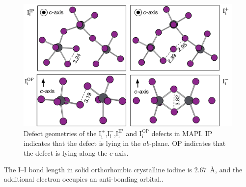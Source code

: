 \begin{figure}[h!]
\centering
  \includegraphics[width=1.0\columnwidth]{figures/ch6/defect_geometries.png}
  \caption[Defect geometries of the $\mathrm{I}_\mathrm{i}^+$,$\mathrm{I}_\mathrm{i}^-$,$\mathrm{I}_\mathrm{i}^\mathrm{IP}$ and $\mathrm{I}_\mathrm{i}^\mathrm{OP}$ defects in MAPI]{Defect geometries of the $\mathrm{I}_\mathrm{i}^+$,$\mathrm{I}_\mathrm{i}^-$,$\mathrm{I}_\mathrm{i}^\mathrm{IP}$ and $\mathrm{I}_\mathrm{i}^\mathrm{OP}$ defects in MAPI. IP indicates that the defect is lying in the $ab$-plane. OP indicates that the defect is lying along the $c$-axis.}
\label{relaxation_workflow}
\end{figure}

The I--I bond length in solid orthorhombic crystalline iodine is \SI{2.67}{\angstrom}, and the additional electron occupies an anti-bonding orbital..



